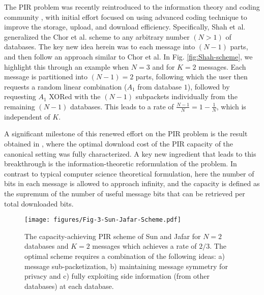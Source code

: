 The PIR problem was recently reintroduced to the information theory and coding community \cite{Shah_Rashmi_Kannan,Chan_Ho_Yamamoto,Fazeli_Vardy_Yaakobi}, with initial effort focused on using advanced coding technique to improve the storage, upload, and download efficiency. Specifically, Shah et al. \cite{Shah_Rashmi_Kannan} generalized the Chor et al. scheme to any arbitrary number $(N>1)$ of databases. The key new idea herein was to  each message into $(N-1)$ parts, and then follow an approach similar to Chor et al. In Fig.  
\ref{fig:Shah-scheme}, we highlight this through an example when $N=3$ and for $K=2$ messages. Each message is partitioned into $(N-1)=2$ parts, following which the user then requests a random linear combination ($A_{1}$ from database $1$), followed by requesting $A_{1}$ XORed with the $(N-1)$ subpackets individually from the remaining $(N-1)$ databases. This leads to a rate of $\frac{N-1}{N}=1-\frac{1}{N}$, which is independent of $K$. 

A significant milestone of this renewed effort on the PIR problem is the result obtained in \cite{sun2017PIRcapacity}, where the optimal download cost of the PIR capacity of the canonical setting was fully characterized. A key new ingredient that leads to this breakthrough is the information-theoretic reformulation of the problem. In contrast to typical computer science theoretical formulation, here the number of bits in each message is allowed to approach infinity, and the capacity is defined as the supremum of the number of useful message bits that can be retrieved per total downloaded bits. 

\begin{figure}[t]
\centering
\vspace{0.2cm}
\texttt{[image: figures/Fig-3-Sun-Jafar-Scheme.pdf]}
\caption{The capacity-achieving PIR scheme of Sun and Jafar  \cite{sun2017PIRcapacity} for $N=2$ databases and $K=2$ messages which achieves a rate of $2/3$. The optimal scheme requires a combination of the following ideas: a) message sub-packetization, b) maintaining message symmetry for privacy and c) fully exploiting side information (from other databases) at each database.  \label{fig:Sun-Jafar-scheme} }
\end{figure}

